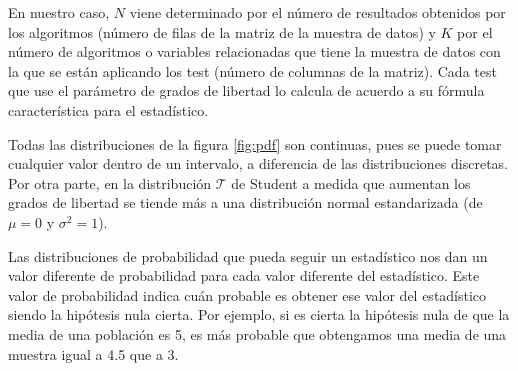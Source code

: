 En nuestro caso, $N$ viene determinado por el número de resultados obtenidos por los algoritmos (número de filas
de la matriz de la muestra de datos) y $K$ por el número de algoritmos o variables relacionadas que tiene la muestra
de datos con la que se están aplicando los test (número de columnas de la matriz). Cada test que use el parámetro
de grados de libertad lo calcula de acuerdo a su fórmula característica para el estadístico. 

Todas las distribuciones de la figura \ref{fig:pdf} son continuas, pues se puede tomar cualquier valor dentro de un
intervalo, a diferencia de las distribuciones discretas. Por otra parte, en la distribución $\mathcal{T}$ de Student
a medida que aumentan los grados de libertad se tiende más a una distribución normal
estandarizada (de $\mu = 0$ y $\sigma^2 = 1$).

Las distribuciones de probabilidad que pueda seguir un estadístico nos dan un valor diferente de probabilidad para
cada valor diferente del estadístico. Este valor de probabilidad indica cuán probable es obtener ese valor del
estadístico siendo la hipótesis nula cierta. Por ejemplo, si es cierta la hipótesis nula de que la media de una población
es 5, es más probable que obtengamos una media de una muestra igual a 4.5 que a 3.



